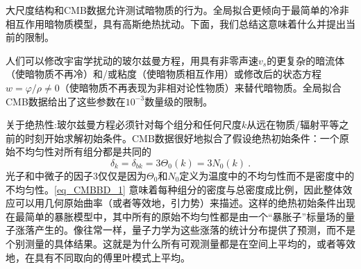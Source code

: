 
大尺度结构和CMB数据允许测试暗物质的行为。全局拟合更倾向于最简单的冷非相互作用暗物质模型，具有高斯绝热扰动。下面，我们总结这意味着什么并提出当前的限制。

人们可以修改宇宙学扰动的玻尔兹曼方程，用具有非零声速$v_s$的更复杂的暗流体（使暗物质不再冷）和/或粘度（使暗物质相互作用）或修改后的状态方程$w = \varphi/\rho \neq 0$（使暗物质不再表现为非相对论性物质）来替代暗物质。全局拟合CMB数据给出了这些参数在$10^{-3}$数量级的限制。

关于绝热性:玻尔兹曼方程必须针对每个组分和任何尺度$k$从远在物质/辐射平等之前的时刻开始求解初始条件。CMB数据很好地拟合了假设绝热初始条件：一个原始不均匀性对所有组分都是共同的
\begin{equation}\label{eq_CMBBD_1}
\delta_k = \delta_{bk} = 3\Theta_0(k) = 3N_0(k)~.
\end{equation}
光子和中微子的因子$3$仅仅是因为$\Theta_0$和$N_0$定义为温度中的不均匀性而不是密度中的不均匀性。\autoref{eq_CMBBD_1} 意味着每种组分的密度与总密度成比例，因此整体效应可以用几何原始曲率（或者等效地，引力势）来描述。这样的绝热初始条件出现在最简单的暴胀模型中，其中所有的原始不均匀性都是由一个“暴胀子”标量场的量子涨落产生的。像往常一样，量子力学为这些涨落的统计分布提供了预测，而不是个别测量的具体结果。这就是为什么所有可观测量都是在空间上平均的，或者等效地，在具有不同取向的傅里叶模式上平均。

